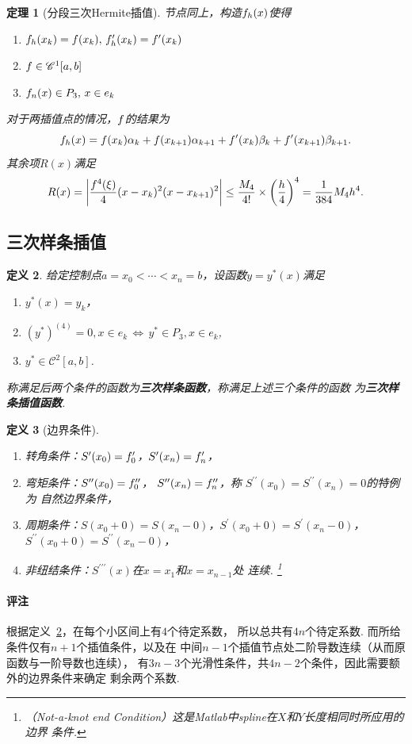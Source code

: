 \documentclass[12pt, a4paper]{article}
\theoremstyle{margin}
\newtheorem{thm}{定理}
\newtheorem{defi}[thm]{定义}
\newcommand{\pr}{\prime}
\newcommand{\hp}{^\prime}
\newcommand{\ms}{\mathscr}
\newcommand{\tbf}{\textbf}
\newcommand{\f}{\mathnormal{f}}
\newcommand\defref[1]{定义~\ref{#1}}
\newcommand{\remark}{\paragraph{评注}}
\begin{document}
  \begin{thm}[分段三次Hermite插值]
    节点同上，构造$\f_h(x)$使得
    \begin{enumerate}
      \item $\f_h(x_k) = \f(x_k),\,\f_h\hp(x_k) = \f\hp(x_k)$
      \item $\f\in \ms{C}^1[a, b]$
      \item $\f_n(x) \in P_3,\,x\in e_k$
    \end{enumerate}
    对于两插值点的情况，$\f$的结果为
    \[
      \f_h(x) = \f(x_k)\alpha_k + \f(x_{k+1})\alpha_{k+1}
       + \f\hp(x_k)\beta_k + \f\hp(x_{k+1})\beta_{k+1}.
    \]
    其余项$R(x)$满足
    \[
      R(x) = \left|\frac{\f^{4}(\xi)}{4}(x-x_{k})^2(x-x_{k+1})^2\right|
      \le \frac{M_4}{4!}\times\left(\frac{h}{4}\right)^4
      =\frac{1}{384}M_4h^4.
    \]
  \end{thm}

\subsection{三次样条插值}
  \begin{defi}
    \label{defi: 三次样条插值}
    给定控制点$a = x_0 < \cdots < x_n = b$，设函数$y=y^*(x)$满足
    \begin{enumerate}
      \item $y^*(x) = y_k$，
      \item $(y^*)^{(4)} = 0,x\in e_k\,\Leftrightarrow
      \,y^* \in P_3,x\in e_k$,
      \item $y^*\in\ms{C}^2[a, b]$.
    \end{enumerate}
    称满足后两个条件的函数为\tbf{三次样条函数}，称满足上述三个条件的函数
    为\tbf{三次样条插值函数}.
  \end{defi}

  \begin{defi}[边界条件]
    $\,$
    \begin{enumerate}
      \item 转角条件：$S\hp(x_0) = \f_0\hp$，$S\hp(x_n) = \f_n\hp$，
      \item 弯矩条件：$S^{\prime\prime}(x_0) = \f_0^{\prime\prime}$，
      $S^{\prime\prime}(x_n) = \f_n^{\prime\prime}$，称
      $S^{\prime\prime}(x_0) = S^{\prime\prime}(x_n) = 0$的特例为
      自然边界条件，
      \item 周期条件：$S(x_0+0)=S(x_n-0)$，$S\hp(x_0+0)=S\hp(x_n-0)$，
      $S^{\prime\prime}(x_0+0)=S^{\prime\prime}(x_n-0)$，
      \item 非纽结条件：$S^{\pr\pr\pr}(x)$在$x=x_1$和$x=x_{n-1}$处
      连续. \footnote{（Not-a-knot end Condition）这是Matlab中spline在$X$和$Y$长度相同时所应用的边界
      条件. }
    \end{enumerate}
  \end{defi}
  \remark
    根据\defref{defi: 三次样条插值}，在每个小区间上有$4$个待定系数，
    所以总共有$4n$个待定系数. 而所给条件仅有$n+1$个插值条件，以及在
    中间$n-1$个插值节点处二阶导数连续（从而原函数与一阶导数也连续），
    有$3n-3$个光滑性条件，共$4n-2$个条件，因此需要额外的边界条件来确定
    剩余两个系数.
\end{document}
